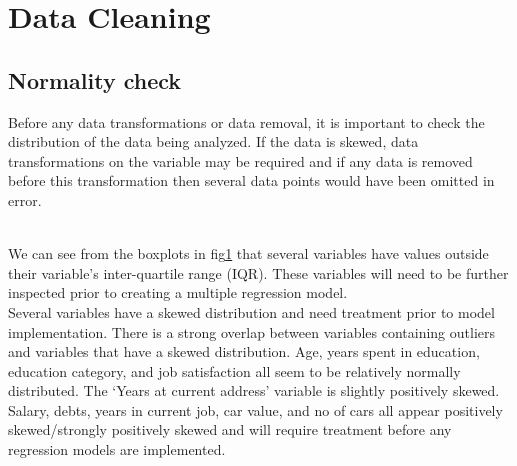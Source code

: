 \documentclass[journal]{IEEEtran}
\begin{document}
\vspace*{-\baselineskip}
\section{Data Cleaning}
\subsection{Normality check}
\indent
Before any data transformations or data removal, it is important to check the distribution of the data being analyzed. If the data is skewed, data transformations on the variable may be required and if any data is removed before this transformation then several data points would have been omitted in error.\cite{lind_lr_assumptions}
\begin{figure}[h]
 \hfill 	
	\label{fig:boxhist}
\end{figure}
\\ \indent
We can see from the boxplots in fig\ref{fig:boxhist} that several variables have values outside their variable's inter-quartile range (IQR). These variables will need to be further inspected prior to creating a multiple regression model. \\\indent
Several variables have a skewed distribution and need treatment prior to model implementation.\cite{intro_to_stat_learning_predictor_transform} There is a strong overlap between variables containing outliers and variables that have a skewed distribution. Age, years spent in education, education category, and job satisfaction all seem to be relatively normally distributed. The `Years at current address' variable is slightly positively skewed. Salary, debts, years in current job, car value, and no of cars all appear positively skewed/strongly positively skewed and will require treatment before any regression models are implemented. 
\end{document}
